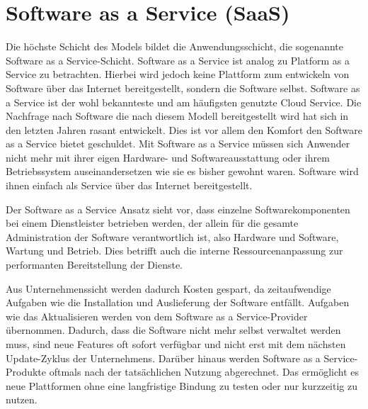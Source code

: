 \section{Software as a Service (SaaS)}
\label{sec:saas}
Die höchste Schicht des Models bildet die Anwendungsschicht, die sogenannte Software as a Service-Schicht.
Software as a Service ist analog zu Platform as a Service zu betrachten. Hierbei wird jedoch keine Plattform zum entwickeln von Software über das Internet bereitgestellt, sondern die Software selbst. \cite{kepes_understanding_????}
Software as a Service ist der wohl bekannteste und am häufigsten genutzte Cloud Service. Die Nachfrage nach Software die nach diesem Modell bereitgestellt wird hat sich in den letzten Jahren rasant entwickelt. Dies ist vor allem den Komfort den Software as a Service bietet geschuldet.
Mit Software as a Service müssen sich Anwender nicht mehr mit ihrer eigen Hardware- und Softwareausstattung oder ihrem Betriebssystem auseinandersetzen wie sie es bisher gewohnt waren. Software wird ihnen einfach als Service über das Internet bereitgestellt.

Der Software as a Service \glqq Ansatz sieht vor, dass einzelne Softwarekomponenten bei einem Dienstleister betrieben werden, der allein für die gesamte Administration der Software verantwortlich ist, also Hardware und Software, Wartung und Betrieb. Dies betrifft auch die interne Ressourcenanpassung zur performanten Bereitstellung der Dienste.\grqq \cite[S. 34]{meinel_virtualisierung_2011}

Aus Unternehmenssicht werden dadurch Kosten gespart, da zeitaufwendige Aufgaben wie die Installation und Auslieferung der Software entfällt. Aufgaben wie das Aktualisieren werden von dem Software as a Service-Provider übernommen. Dadurch, dass die Software nicht mehr selbst verwaltet werden muss, sind neue Features oft sofort verfügbar und nicht erst mit dem nächsten Update-Zyklus der Unternehmens.
Darüber hinaus werden Software as a Service-Produkte oftmals nach der tatsächlichen Nutzung abgerechnet. Das ermöglicht es neue Plattformen ohne eine langfristige Bindung zu testen oder nur kurzzeitig zu nutzen.